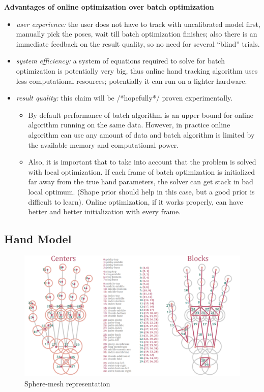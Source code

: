 \textbf{Advantages of online optimization over batch optimization}
\begin{itemize}
\item \textit{user experience:} the user does not have to track with uncalibrated model first, manually pick the poses, wait till batch optimization finishes; also there is an immediate feedback on the result quality, so no need for several ``blind'' trials.
\vspace{-1em}
\item \textit{system efficiency:} a system of equations required to solve for batch optimization is   potentially very big, thus online hand tracking algorithm uses less computational resources; potentially it can run on a lighter hardware.
\item \textit{result quality:} this claim will be /*hopefully*/ proven experimentally. 

\begin{itemize}
\item By default performance of batch algorithm is an upper bound for online algorithm running on the same data. However, in practice online algorithm can use any amount of data and batch algorithm is limited by the available memory and computational power.
\item  Also, it is important that to take into account that the problem is solved with local optimization. If each frame of batch optimization is initialized far away from the true hand parameters, the solver can get stack in bad local optimum. (Shape prior should help in this case, but a good prior is difficult to learn). Online optimization, if it works properly, can have better and better initialization with every frame.
\end{itemize}
\end{itemize}

\subsection {Hand Model}

\begin{figure}[h!]
\centering
\includegraphics[width=1\linewidth]{figures/centers-blocks}
\caption{Sphere-mesh representation}
\label{fig:centers-blocks}
\end{figure}

